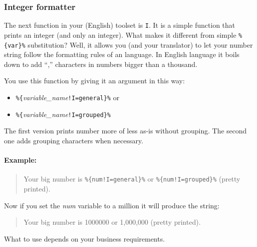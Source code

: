 \subsubsection{Integer formatter}
The next function in your (English) toolset is \texttt{I}. 
It is a simple function that prints an integer (and only an integer). What makes it different from simple \verb+%{var}%+ substitution? 
Well, it allows you (and your translator) to let your number string follow the formatting rules of an language. 
In English language it boils down to add ``,'' characters in numbers bigger than a thousand. 

You use this function by giving it an argument in this way:
\begin{itemize}
  \item \verb+%{+\textit{variable\_name}\verb+!I=general}%+ or
  \item \verb+%{+\textit{variable\_name}\verb+!I=grouped}%+
\end{itemize}
The first version prints number more of less as-is without grouping. The second one adds grouping characters when necessary. 

\paragraph{Example:}
\begin{quote}
  Your big number is \verb+%{num!I=general}%+ or \verb+%{num!I=grouped}%+ (pretty printed).
\end{quote}
Now if you set the \textit{num} variable to a million it will produce the string:
\begin{quote}
  Your big number is 1000000 or 1,000,000 (pretty printed).
\end{quote}

What to use depends on your business requirements.

